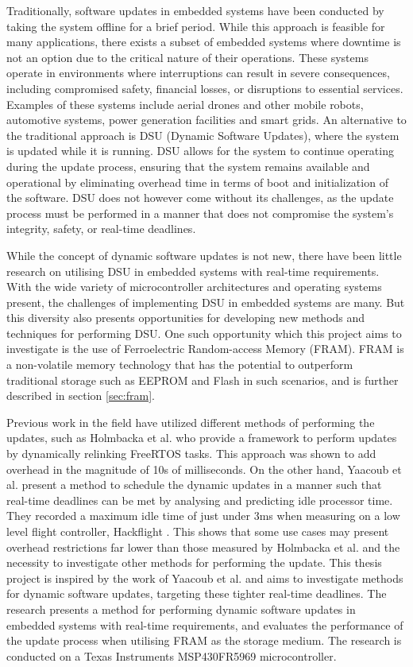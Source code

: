 Traditionally, software updates in embedded systems have been conducted by taking the system offline for a brief period. While this approach is feasible for many applications, there exists a subset of embedded systems where downtime is not an option due to the critical nature of their operations. These systems operate in environments where interruptions can result in severe consequences, including compromised safety, financial losses, or disruptions to essential services. Examples of these systems include aerial drones and other mobile robots, automotive systems, power generation facilities and smart grids. An alternative to the traditional approach is DSU (Dynamic Software Updates), where the system is updated while it is running. DSU allows for the system to continue operating during the update process, ensuring that the system remains available and operational by eliminating overhead time in terms of boot and initialization of the software. DSU does not however come without its challenges, as the update process must be performed in a manner that does not compromise the system's integrity, safety, or real-time deadlines.

While the concept of dynamic software updates is not new, there have been little research on utilising DSU in embedded systems with real-time requirements. With the wide variety of microcontroller architectures and operating systems present, the challenges of implementing DSU in embedded systems are many. But this diversity also presents opportunities for developing new methods and techniques for performing DSU. One such opportunity which this project aims to investigate is the use of Ferroelectric Random-access Memory (FRAM). FRAM is a non-volatile memory technology that has the potential to outperform traditional storage such as EEPROM and Flash in such scenarios, and is further described in section \ref{sec:fram}.

Previous work in the field have utilized different methods of performing the updates, such as Holmbacka et al. \cite{dynUpdateFramework} who provide a framework to perform updates by dynamically relinking FreeRTOS tasks. This approach was shown to add overhead in the magnitude of 10s of milliseconds. On the other hand, Yaacoub et al. \cite{NeRTA} present a method to schedule the dynamic updates in a manner such that real-time deadlines can be met by analysing and predicting idle processor time. They recorded a maximum idle time of just under 3ms when measuring on a low level flight controller, Hackflight \cite{hackflight}. This shows that some use cases may present overhead restrictions far lower than those measured by Holmbacka et al. and the necessity to investigate other methods for performing the update. This thesis project is inspired by the work of Yaacoub et al. and aims to investigate methods for dynamic software updates, targeting these tighter real-time deadlines. The research presents a method for performing dynamic software updates in embedded systems with real-time requirements, and evaluates the performance of the update process when utilising FRAM as the storage medium. The research is conducted on a Texas Instruments MSP430FR5969 microcontroller.

